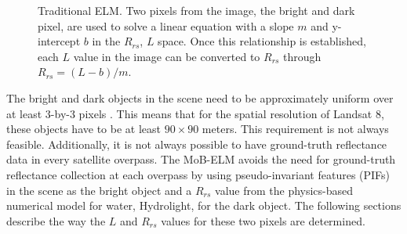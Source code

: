 \documentclass[onecolumn,3p,letterpaper]{elsarticle}
\begin{document}
\begin{figure}[htb]
	\centering
\caption{Traditional ELM. Two pixels from the image, the bright and dark pixel, are used to solve a linear equation with a slope $m$ and y-intercept $b$ in the $R_{rs}$, $L$ space. Once this relationship is established, each $L$ value in the image can be converted to $R_{rs}$ through $R_{rs}=(L-b)/m$. \label{fig:ELMregression}}
\end{figure}

The bright and dark objects in the scene need to be approximately uniform over at least 3-by-3 pixels \citep{Schott}. This means that for the spatial resolution of Landsat 8, these objects have to be at least $90\times 90$ meters. This requirement is not always feasible. Additionally, it is not always possible to have ground-truth reflectance data in every satellite overpass. The MoB-ELM avoids the need for ground-truth  reflectance collection at each overpass by using pseudo-invariant features (PIFs) in the scene as the bright object and a $R_{rs}$ value from the physics-based numerical model for water, Hydrolight, for the dark object. The following sections describe the way the $L$ and $R_{rs}$ values for these two pixels are determined.
\end{document}
